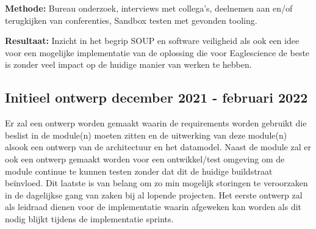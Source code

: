 \textbf{Methode:} Bureau onderzoek, interviews met collega's, deelnemen aan en/of terugkijken van conferenties, Sandbox testen met gevonden tooling.

\textbf{Resultaat:} Inzicht in het begrip SOUP en software veiligheid als ook een idee voor een mogelijke implementatie van de oplossing die voor Eaglescience de beste is zonder veel impact op de huidige manier van werken te hebben.

\subsection{Initieel ontwerp \textbf{december 2021 - februari 2022 }}\label{subsec:initieel-ontwerp}
Er zal een ontwerp worden gemaakt waarin de requirements worden gebruikt die beslist in de module(n) moeten zitten en de uitwerking van deze module(n) alsook een ontwerp van de architectuur en het datamodel. Naast de module zal er ook een ontwerp gemaakt worden voor een ontwikkel/test omgeving om de module continue te kunnen testen zonder dat dit de huidige buildstraat beïnvloed. Dit laatste is van belang om zo min mogelijk storingen te veroorzaken in de dagelijkse gang van zaken bij al lopende projecten. Het eerste ontwerp zal als leidraad dienen voor de implementatie waarin afgeweken kan worden als dit nodig blijkt tijdens de implementatie sprints.

